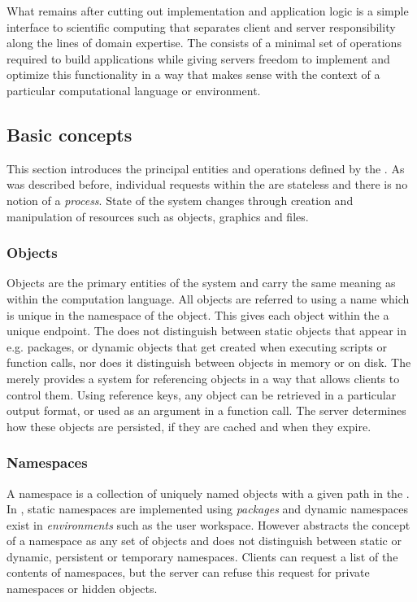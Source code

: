 What remains after cutting out implementation and application logic is a simple interface to scientific computing that separates client and server responsibility along the lines of domain expertise. The \OpenCPU \API consists of a minimal set of operations required to build applications while giving servers freedom to implement and optimize this functionality in a way that makes sense with the context of a particular computational language or environment. 

\subsection{Basic concepts}

This section introduces the principal entities and operations defined by the \API. As was described before, individual requests within the \OpenCPU \API are stateless and there is no notion of a \emph{process}. State of the system changes through creation and manipulation of resources such as objects, graphics and files. 

\subsubsection{Objects}

Objects are the primary entities of the system and carry the same meaning as within the computation language. All objects are referred to using a name which is unique in the namespace of the object. This gives each object within the \API a unique \HTTP endpoint. The \API does not distinguish between static objects that appear in e.g. packages, or dynamic objects that get created when executing scripts or function calls, nor does it distinguish between objects in memory or on disk. The \API merely provides a system for referencing objects in a way that allows clients to control them. Using reference keys, any object can be retrieved in a particular output format, or used as an argument in a function call. The server determines how these objects are persisted, if they are cached and when they expire.

\subsubsection{Namespaces}

A namespace is a collection of uniquely named objects with a given path in the \API. In \R, static namespaces are implemented using \emph{packages} and dynamic namespaces exist in \emph{environments} such as the user workspace. However \OpenCPU abstracts the concept of a namespace as any set of objects and does not distinguish between static or dynamic, persistent or temporary namespaces. Clients can request a list of the contents of namespaces, but the server can refuse this request for private namespaces or hidden objects. 

